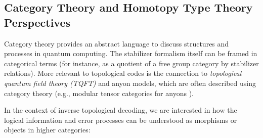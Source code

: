\documentclass[11pt]{article}
\begin{document}
\subsection{Category Theory and Homotopy Type Theory Perspectives}
Category theory provides an abstract language to discuss structures and processes in quantum computing. The stabilizer formalism itself can be framed in categorical terms (for instance, as a quotient of a free group category by stabilizer relations). More relevant to topological codes is the connection to \textit{topological quantum field theory (TQFT)} and anyon models, which are often described using category theory (e.g., modular tensor categories for anyons \cite{Nayak2008}).

In the context of inverse topological decoding, we are interested in how the logical information and error processes can be understood as morphisms or objects in higher categories:
\end{document}
